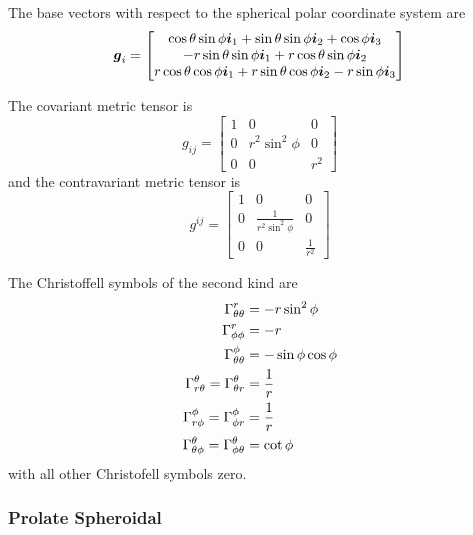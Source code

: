 The base vectors with respect to the spherical polar coordinate system are
\begin{equation}
  \vect{g}_{i}=\begin{bmatrix} 
    \cos\theta\sin\phi\vect{i}_{1}+\sin\theta\sin\phi\vect{i}_{2}+\cos\phi\vect{i}_{3} \\ 
    -r\sin\theta\sin\phi\vect{i}_{1}+r\cos\theta\sin\phi\vect{i}_{2} \\
    r\cos\theta\cos\phi\vect{i}_{1}+r\sin\theta\cos\phi\vect{i}_{2}-r\sin\phi\vect{i}_{3}
  \end{bmatrix}
\end{equation}

The covariant metric tensor is
\begin{equation}
  g_{ij}=\begin{bmatrix}
    1 & 0 & 0 \\
    0 & r^{2}\sin^{2}\phi & 0 \\
    0 & 0 & r^{2} 
  \end{bmatrix}
\end{equation}
and the contravariant metric tensor is
\begin{equation}
  g^{ij}=\begin{bmatrix}
    1 & 0 & 0 \\
    0 &  \frac{1}{r^{2}\sin^{2}\phi} & 0 \\
    0 & 0 & \frac{1}{r^{2}} 
  \end{bmatrix}
\end{equation}

The Christoffell symbols of the second kind are
\begin{align}
   \Gamma^{r}_{\theta\theta} &=-r\sin^{2}\phi \\
   \Gamma^{r}_{\phi\phi} &=-r \\
   \Gamma^{\phi}_{\theta\theta} &=-\sin\phi\cos\phi \\
   \Gamma^{\theta}_{r\theta} = \Gamma^{\theta}_{\theta r} &=\frac{1}{r} \\
   \Gamma^{\phi}_{r\phi} = \Gamma^{\phi}_{\phi r} &=\frac{1}{r} \\
   \Gamma^{\theta}_{\theta\phi} = \Gamma^{\theta}_{\phi\theta} &=\cot\phi
\end{align}
with all other Christofell symbols zero.

\subsubsection{Prolate Spheroidal}

